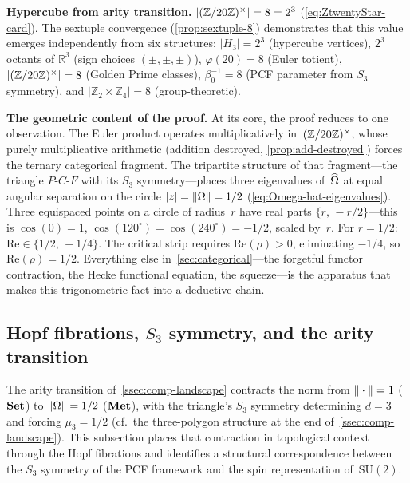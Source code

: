 \smallskip\noindent\textbf{Hypercube from arity transition.}
$|(\mathbb{Z}/20\mathbb{Z})^\times|=8=2^3$ (\cref{eq:ZtwentyStar-card}).  The sextuple
convergence (\cref{prop:sextuple-8}) demonstrates that
this value emerges independently from six
structures: $|H_3|=2^3$ (hypercube vertices), $2^3$ octants of
$\mathbb{R}^3$ (sign choices $(\pm,\pm,\pm)$), $\varphi(20)=8$
(Euler totient), $|(\mathbb{Z}/20\mathbb{Z})^\times|=8$ (Golden Prime classes),
$\beta_0^{-1}=8$ (PCF parameter from $S_3$ symmetry), and
$|\mathbb{Z}_2\times\mathbb{Z}_4|=8$ (group-theoretic).

\smallskip\noindent\textbf{The geometric content of the proof.}
At its core, the proof reduces to one observation.  The
Euler product operates multiplicatively in~$(\mathbb{Z}/20\mathbb{Z})^\times$, whose purely
multiplicative arithmetic (addition destroyed,
\cref{prop:add-destroyed}) forces the ternary categorical
fragment.  The tripartite structure of that fragment---the triangle
$P$-$C$-$F$ with its $S_3$ symmetry---places three eigenvalues
of~$\widehat{\Omega}$ at equal angular separation on the circle
$|z|=\|\Omega\|=1/2$
(\cref{eq:Omega-hat-eigenvalues}).  Three equispaced points on a
circle of radius~$r$ have real parts $\{r,\,-r/2\}$---this is
$\cos(0)=1$, $\cos(120^\circ)=\cos(240^\circ)=-1/2$, scaled by~$r$.  For
$r=1/2$: $\mathrm{Re}\in\{1/2,\,-1/4\}$.  The critical strip
requires $\mathrm{Re}(\rho)>0$, eliminating $-1/4$, so
$\mathrm{Re}(\rho)=1/2$.  Everything else in~\cref{sec:categorical}---the
forgetful functor contraction, the Hecke
functional equation, the squeeze---is the apparatus that makes this
trigonometric fact into a deductive chain.


\subsection{Hopf fibrations, \texorpdfstring{$S_3$}{S3} symmetry, and the arity transition}\label{ssec:hopf-pcf}

The arity transition of~\cref{ssec:comp-landscape} contracts the
norm from $\|\cdot\|=1$ ($\mathbf{Set}$) to $\|\Omega\|=1/2$ ($\mathbf{Met}$),
with the triangle's $S_3$ symmetry determining $d=3$ and forcing
$\mu_3=1/2$ (cf.\ the three-polygon structure at the end
of~\cref{ssec:comp-landscape}).  This subsection places that
contraction in topological context through the Hopf fibrations and
identifies a structural correspondence between the $S_3$ symmetry of
the PCF framework and the spin representation of~$\mathrm{SU}(2)$.


